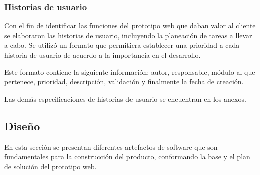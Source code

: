 \documentclass[../Main.tex]{subfiles}
\begin{document}
    \subsubsection{Historias de usuario}
    \begin{justify}
    Con el fin de identificar las funciones del prototipo web que daban valor al cliente se elaboraron las historias de usuario, incluyendo la planeación de tareas a llevar a cabo.
    Se utilizó un formato que permitiera establecer una prioridad a cada historia de usuario de acuerdo a la importancia en el desarrollo.
    
    Este formato contiene la siguiente información: autor, responsable, módulo al que pertenece, prioridad, descripción, validación y finalmente la fecha de creación.
    \end{justify}
    
    
        
    \begin{justify}
    Las demás especificaciones de historias de usuario se encuentran en los anexos.
    \end{justify}
    
    \newpage
    \subsection{Diseño}
    \begin{justify}
    En esta sección se presentan diferentes artefactos de software que son fundamentales para la construcción del producto, conformando la base y el plan de solución del prototipo web.
    \end{justify}
\end{document}
